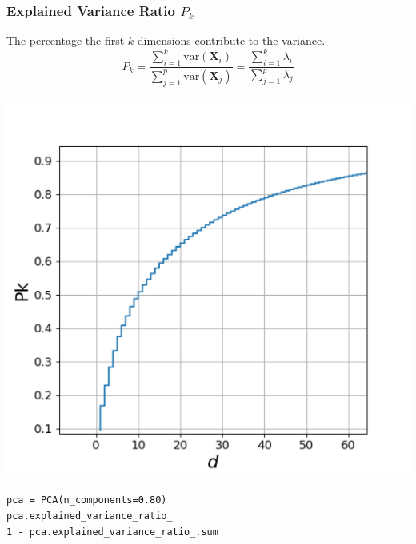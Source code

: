 \documentclass[11pt]{article}
\theoremstyle{definition}
\begin{document}
\subsubsection{Explained Variance Ratio $P_k$}
\begin{minipage}{0.55\linewidth}
	The percentage the first $k$ dimensions contribute to the variance.
	\begin{equation*}
	P_k = \frac{\sum_{i=1}^k \text{var}\left(\textbf{X}_i\right)}{\sum_{j=1}^p \text{var}\left(\textbf{X}_j\right)} = \frac{\sum_{i=1}^{k} \lambda_i}{\sum_{j=1}^{p} \lambda_j}
	\end{equation*}
\end{minipage}
\begin{minipage}{0.4\linewidth}
	\begin{center}
		\includegraphics[width=\linewidth]{img/explained_variance_ratio}
	\end{center}
\end{minipage}

\begin{verbatim}
pca = PCA(n_components=0.80)
pca.explained_variance_ratio_
1 - pca.explained_variance_ratio_.sum
\end{verbatim}
\end{document}
